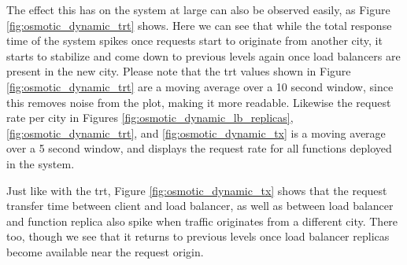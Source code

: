 The effect this has on the system at large can also be observed easily, as Figure \ref{fig:osmotic_dynamic_trt} shows.
Here we can see that while the total response time of the system spikes once requests start to originate from another city, it starts to stabilize and come down to previous levels again once load balancers are present in the new city.
Please note that the \gls{trt} values shown in Figure \ref{fig:osmotic_dynamic_trt} are a moving average over a 10 second window, since this removes noise from the plot, making it more readable.
Likewise the request rate per city in Figures \ref{fig:osmotic_dynamic_lb_replicas}, \ref{fig:osmotic_dynamic_trt}, and \ref{fig:osmotic_dynamic_tx} is a moving average over a 5 second window, and displays the request rate for all functions deployed in the system.

Just like with the \gls{trt}, Figure \ref{fig:osmotic_dynamic_tx} shows that the request transfer time between client and load balancer, as well as between load balancer and function replica also spike when traffic originates from a different city.
There too, though we see that it returns to previous levels once load balancer replicas become available near the request origin.
